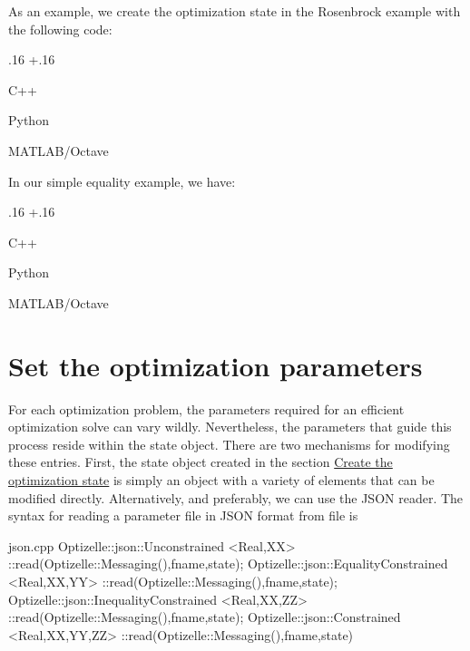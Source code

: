 \documentclass{report}
\newlength{\gobble}
\newenvironment{boldlist}
    {\begin{list}{}{
        \labelwidth.16\textwidth
        \leftmargin\dimexpr\leftmargin+.16\textwidth
        \renewcommand\makelabel[1]{%
            \textbf{##1}}}}
    {\vspace{-\dimexpr\baselineskip+2\itemsep}\end{list}}
\newcommand{\shortexampleitem}[2]{
    \item[Language] #1
    \item[Code]\begin{minipage}[t]{\textwidth}\vspace{\dimexpr-\medskipamount-2ex}#2\end{minipage}
    \item[]}
\newcommand{\secstate}{Create the optimization state}
\newcommand{\secparams}{Set the optimization parameters}
\begin{document}
        As an example, we create the optimization state in the Rosenbrock example with the following code:
\begin{boldlist}
    \shortexampleitem
        {C++}
        {}

    \shortexampleitem
        {Python}
        {}

    \shortexampleitem
        {MATLAB/Octave}
        {}
\end{boldlist}
In our simple equality example, we have:
\begin{boldlist}
    \shortexampleitem
        {C++}
        {}

    \shortexampleitem
        {Python}
        {}

    \shortexampleitem
        {MATLAB/Octave}
        {}
\end{boldlist}

\section{\secparams}\label{sec:params}

        For each optimization problem, the parameters required for an efficient optimization solve can vary wildly.  Nevertheless, the parameters that guide this process reside within the state object.  There are two mechanisms for modifying these entries.  First, the state object created in the section \hyperref[sec:state]{\secstate} is simply an object with a variety of elements that can be modified directly.  Alternatively, and preferably, we can use the JSON reader.  The syntax for reading a parameter file in JSON format from file is
\begin{filecontents*}{json.cpp}
Optizelle::json::Unconstrained <Real,XX>
    ::read(Optizelle::Messaging(),fname,state);
Optizelle::json::EqualityConstrained <Real,XX,YY>
    ::read(Optizelle::Messaging(),fname,state);
Optizelle::json::InequalityConstrained <Real,XX,ZZ>
    ::read(Optizelle::Messaging(),fname,state);
Optizelle::json::Constrained <Real,XX,YY,ZZ>
    ::read(Optizelle::Messaging(),fname,state)
\end{filecontents*}
\end{document}
